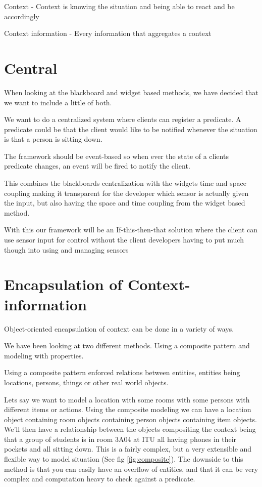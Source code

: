 \documentclass[]{report}
\begin{document}
	Context - Context is knowing the situation and being able to react and be accordingly
	
	Context information - Every information that aggregates a context
	
	

\section{Central}

When looking at the blackboard and widget based methods, we have decided that we want to include a little of both.

We want to do a centralized system where clients can register a predicate. A predicate could be that the client would like to be notified whenever the situation is that a person is sitting down.

The framework should be event-based so when ever the state of a clients predicate changes, an event will be fired to notify the client.  

This combines the blackboards centralization with the widgets time and space coupling making it transparent for the developer which sensor is actually given the input, but also having the space and time coupling from the widget based method.

With this our framework will be an If-this-then-that solution where the client can use sensor input for control without the  client developers having to put much though into using and managing sensors   


\section{Encapsulation of Context-information}
Object-oriented encapsulation of context can be done in a variety of ways.

We have been looking at two different methods. Using a composite pattern and modeling with properties.

Using a composite pattern enforced relations between entities, entities being locations, persons, things or other real world objects.

Lets say we want to model a location with some rooms with some persons with different items or actions. Using the composite modeling we can have a location object containing room objects containing person objects containing item objects. We'll then have a relationship between the objects compositing the context being that a group of students is in room 3A04 at ITU all having phones in their pockets and all sitting down. This is a fairly complex, but a very extensible and flexible way to model situation (See fig \ref{fig:composite}). The downside to this method is that you can easily have an overflow of entities, and that it can be very complex and computation heavy to check against a  predicate.
\end{document}
